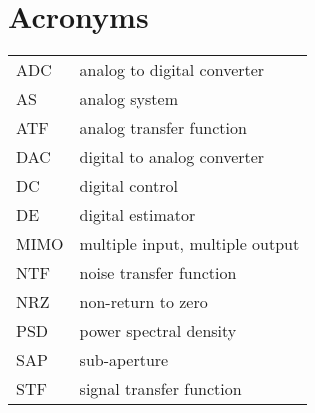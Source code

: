 \section*{Acronyms}
\begin{tabular}{ p{2cm} l }
    ADC        &  analog to digital converter \\
    AS         &  analog system \\
    ATF        &  analog transfer function \\
    DAC        &  digital to analog converter \\
    DC         &  digital control \\
    DE         &  digital estimator \\
    MIMO       &  multiple input, multiple output \\
    NTF        &  noise transfer function \\
    NRZ        &  non-return to zero \\
    PSD        &  power spectral density \\
    SAP        &  sub-aperture \\
    STF        &  signal transfer function \\

\end{tabular}
